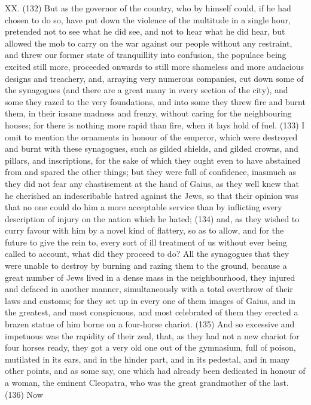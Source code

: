 XX. (132) But as the governor of the country, who by himself could, if he had chosen to do so,
have put down the violence of the multitude in a single hour, pretended not to see what he did see,
and not to hear what he did hear, but allowed the mob to carry on the war against our people
without any restraint, and threw our former state of tranquillity into confusion, the populace being
excited still more, proceeded onwards to still more shameless and more audacious designs and
treachery, and, arraying very numerous companies, cut down some of the synagogues (and there
are a great many in every section of the city), and some they razed to the very foundations, and
into some they threw fire and burnt them, in their insane madness and frenzy, without caring for the
neighbouring houses; for there is nothing more rapid than fire, when it lays hold of fuel. (133) I omit
to mention the ornaments in honour of the emperor, which were destroyed and burnt with these
synagogues, such as gilded shields, and gilded crowns, and pillars, and inscriptions, for the sake of
which they ought even to have abstained from and spared the other things; but they were full of
confidence, inasmuch as they did not fear any chastisement at the hand of Gaius, as they well
knew that he cherished an indescribable hatred against the Jews, so that their opinion was that no
one could do him a more acceptable service than by inflicting every description of injury on the
nation which he hated; (134) and, as they wished to curry favour with him by a novel kind of flattery,
so as to allow, and for the future to give the rein to, every sort of ill treatment of us without ever
being called to account, what did they proceed to do? All the synagogues that they were unable to
destroy by burning and razing them to the ground, because a great number of Jews lived in a
dense mass in the neighbourhood, they injured and defaced in another manner, simultaneously
with a total overthrow of their laws and customs; for they set up in every one of them images of
Gaius, and in the greatest, and most conspicuous, and most celebrated of them they erected a
brazen statue of him borne on a four-horse chariot. (135) And so excessive and impetuous was
the rapidity of their zeal, that, as they had not a new chariot for four horses ready, they got a very
old one out of the gymnasium, full of poison, mutilated in its ears, and in the hinder part, and in its
pedestal, and in many other points, and as some say, one which had already been dedicated in
honour of a woman, the eminent Cleopatra, who was the great grandmother of the last. (136) Now
